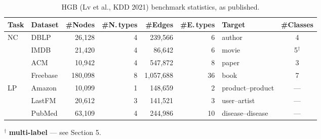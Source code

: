 \begin{table}[htbp]
\centering
\small
\caption{HGB (Lv et al., KDD 2021) benchmark statistics, as published.}
\label{p2:tab:hgb}
\begin{tabular}{llrrrrlc}
\toprule
Task & Dataset & \#Nodes & \#N.\,types & \#Edges & \#E.\,types & Target & \#Classes \\
\midrule
\multirow{4}{*}{NC}
 & DBLP     & 26{,}128  & 4 & 239{,}566   & 6  & author  & 4 \\
 & IMDB     & 21{,}420  & 4 & 86{,}642    & 6  & movie   & 5$^{\dagger}$ \\
 & ACM      & 10{,}942  & 4 & 547{,}872   & 8  & paper   & 3 \\
 & Freebase & 180{,}098 & 8 & 1{,}057{,}688 & 36 & book  & 7 \\
\midrule
\multirow{3}{*}{LP}
 & Amazon   & 10{,}099  & 1 & 148{,}659   & 2  & product--product & --- \\
 & LastFM   & 20{,}612  & 3 & 141{,}521   & 3  & user--artist     & --- \\
 & PubMed   & 63{,}109  & 4 & 244{,}986   & 10 & disease--disease & --- \\
\bottomrule
\end{tabular}

\vspace{2pt}
{\footnotesize $^{\dagger}$ \textbf{multi-label} --- see Section 5.}
\end{table}

